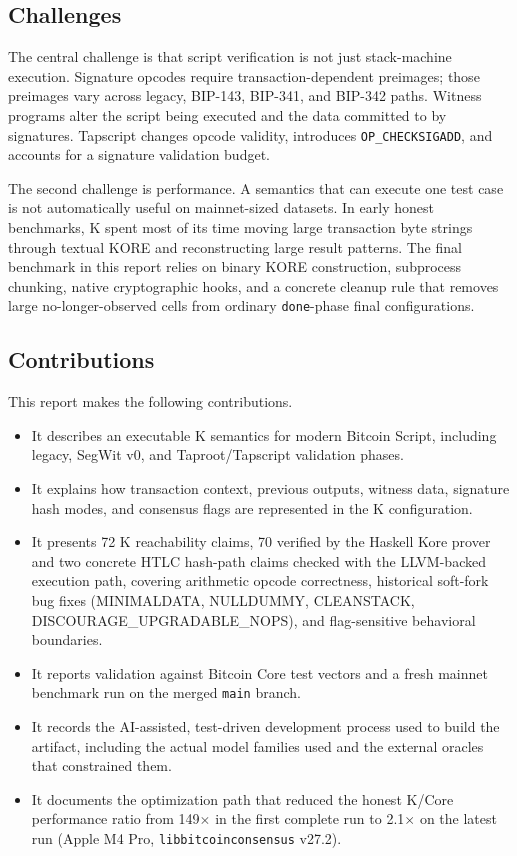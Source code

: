 \documentclass[conference]{IEEEtran}
\newcommand{\bitcoin}{Bitcoin\xspace}
\begin{document}
\subsection{Challenges}

The central challenge is that script verification is not just stack-machine
execution.  Signature opcodes require transaction-dependent preimages; those
preimages vary across legacy, BIP-143, BIP-341, and BIP-342 paths.  Witness
programs alter the script being executed and the data committed to by
signatures.  Tapscript changes opcode validity, introduces
\texttt{OP\_CHECKSIGADD}, and accounts for a signature validation budget.

The second challenge is performance.  A semantics that can execute one test
case is not automatically useful on mainnet-sized datasets.  In early honest
benchmarks, K spent most of its time moving large transaction byte strings
through textual KORE and reconstructing large result patterns.  The final
benchmark in this report relies on binary KORE construction, subprocess
chunking, native cryptographic hooks, and a concrete cleanup rule that removes
large no-longer-observed cells from ordinary \texttt{done}-phase final
configurations.

\subsection{Contributions}

This report makes the following contributions.

\begin{itemize}
  \item It describes an executable K semantics for modern \bitcoin Script,
  including legacy, SegWit v0, and Taproot/Tapscript validation phases.
  \item It explains how transaction context, previous outputs, witness data,
  signature hash modes, and consensus flags are represented in the K
  configuration.
  \item It presents 72 K reachability claims, 70 verified by the Haskell Kore
  prover and two concrete HTLC hash-path claims checked with the LLVM-backed
  execution path, covering arithmetic opcode correctness, historical soft-fork
  bug fixes (MINIMALDATA, NULLDUMMY, CLEANSTACK,
  DISCOURAGE\_UPGRADABLE\_NOPS), and flag-sensitive behavioral boundaries.
  \item It reports validation against Bitcoin Core test vectors and a fresh
  mainnet benchmark run on the merged \texttt{main} branch.
  \item It records the AI-assisted, test-driven development process used to
  build the artifact, including the actual model families used and the external
  oracles that constrained them.
  \item It documents the optimization path that reduced the honest K/Core
  performance ratio from 149$\times$ in the first complete run to 2.1$\times$
  on the latest run (Apple M4 Pro, \texttt{libbitcoinconsensus} v27.2).
\end{itemize}
\end{document}
